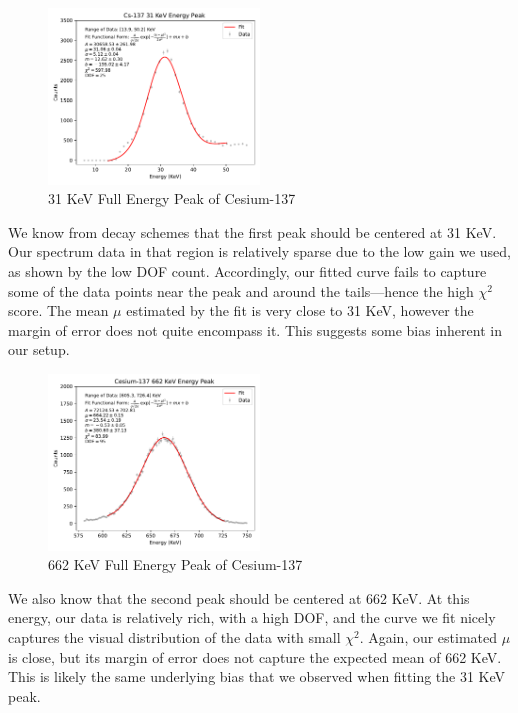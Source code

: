 \documentclass[12pt, letterpaper]{article}
\begin{document}
\begin{figure}[h]
    \centering
    \includegraphics[width=0.5\textwidth]{experiment1/figures/cs137/peak-31.pdf}
    \caption{31 KeV Full Energy Peak of Cesium-137}
    \label{fig:cs137-31}
\end{figure}

We know from decay schemes that the first peak should be centered at 31 KeV. Our spectrum data in that region is relatively sparse due to the low gain we used, as shown by the low DOF count. Accordingly, our fitted curve fails to capture some of the data points near the peak and around the tails—hence the high $\chi^2$ score. The mean $\mu$ estimated by the fit is very close to 31 KeV, however the margin of error does not quite encompass it. This suggests some bias inherent in our setup. 

\begin{figure}[h]
    \centering
    \includegraphics[width=0.5\textwidth]{experiment1/figures/cs137/peak-662.pdf}
    \caption{662 KeV Full Energy Peak of Cesium-137}
    \label{fig:cs137-662}
\end{figure}

We also know that the second peak should be centered at 662 KeV. At this energy, our data is relatively rich, with a high DOF, and the curve we fit nicely captures the visual distribution of the data with small $\chi^2$. Again, our estimated $\mu$ is close, but its margin of error does not capture the expected mean of 662 KeV. This is likely the same underlying bias that we observed when fitting the 31 KeV peak. 
\end{document}
